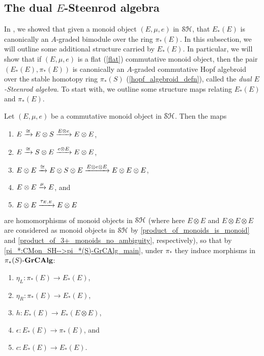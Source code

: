 \documentclass[../main.tex]{subfiles}
\begin{document}
\subsection{The dual \texorpdfstring{$E$}{E}-Steenrod algebra}\label{subsection:E-Steenrod_algebra}

In , we showed that given a monoid object $(E,\mu,e)$ in $\mathcal{SH}$, that $E_*(E)$ is canonically an $A$-graded bimodule over the ring $\pi_*(E)$. In this subsection, we will outline some additional structure carried by $E_*(E)$. In particular, we will show that if $(E,\mu,e)$ is a flat (\autoref{flat}) commutative monoid object, then the pair $(E_*(E),\pi_*(E))$ is canonically an $A$-graded commutative Hopf algebroid over the stable homotopy ring $\pi_*(S)$ (\autoref{hopf_algebroid_defn}), called the \emph{dual $E$-Steenrod algebra}. To start with, we outline some structure maps relating $E_*(E)$ and $\pi_*(E)$.

\begin{proposition}\label{structure_maps_are_monoid_homos_main}
    Let $(E,\mu,e)$ be a commutative monoid object in $\mathcal{SH}$. Then the maps\begin{enumerate}
        \item $E\xrightarrow\cong E\otimes S\xrightarrow{E\otimes e}E\otimes E$,
        \item $E\xrightarrow\cong S\otimes E\xrightarrow{e\otimes E}E\otimes E$,
        \item $E\otimes E\xrightarrow\cong E\otimes S\otimes E\xrightarrow{E\otimes e\otimes E}E\otimes E\otimes E$,
        \item $E\otimes E\xrightarrow\mu E$, and
        \item $E\otimes E\xrightarrow{\tau_{E,E}}E\otimes E$
    \end{enumerate}
    are homomorphisms of monoid objects in $\mathcal{SH}$ (where here $E\otimes E$ and $E\otimes E\otimes E$ are considered as monoid objects in $\mathcal{SH}$ by \autoref{product_of_monoids_is_monoid} and \autoref{product_of_3+_monoids_no_ambiguity}, respectively), so that by \autoref{pi_*:CMon_SH-->pi_*(S)-GrCAlg_main}, under $\pi_*$ they induce morphisms in ${\pi_*(S)}\text-\mathbf{GrCAlg}$:
    \begin{enumerate}
        \item $\eta_L:\pi_*(E)\to E_*(E)$,
        \item $\eta_R:\pi_*(E)\to E_*(E)$,
        \item $h:E_*(E)\to E_*(E\otimes E)$,
        \item $\epsilon:E_*(E)\to \pi_*(E)$, and
        \item $c:E_*(E)\to E_*(E)$.
    \end{enumerate}
\end{proposition}
\end{document}

